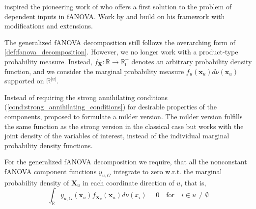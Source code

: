 \citet{stone1994} inspired the pioneering work of \citet{hooker2007} who offers a first solution to the problem of dependent inputs in fANOVA. Work by \cite{chastaing2012} and \cite{rahman2014} build on his framework with modifications and extensions.\par
The generalized fANOVA decomposition still follows the overarching form of \autoref{def:fanova_decomposition}.
However, we no longer work with a product-type probability measure. 
Instead, $f_{\boldsymbol{X}}: \mathbb{R} \rightarrow \mathbb{R}_{0}^{+}$ 
denotes an arbitrary probability density function, and we consider 
the marginal probability measure 
$f_{u}(\boldsymbol{x}_u) d\nu(\boldsymbol{x}_u)$ supported on $\mathbb{R}^{|u|}$.

Instead of requiring the strong annihilating conditions (\autoref{cond:strong_annihilating_conditions}) for desirable properties of the components, \cite{rahman2014} proposed to formulate a milder version.
The milder version fulfills the same function as the strong version in the classical case but works with the joint density of the variables of interest, instead of the individual marginal probability density functions.
\begin{condition}\label{cond:weak_annihilating_conditions}
    For the generalized fANOVA decomposition we require, that all the nonconstant fANOVA component functions $y_{u, G}$ integrate to zero w.r.t. the marginal probability density of $\boldsymbol{X}_u$ in each coordinate direction of $u$, that is,
\begin{equation}
    \int_{\mathbb{R}} y_{u, G}(\boldsymbol{x}_u) f_{\boldsymbol{X}_u}(\boldsymbol{x}_u) d\nu (x_i) = 0 \quad \text{for} \quad i \in u \neq \emptyset
\end{equation}
\end{condition}


